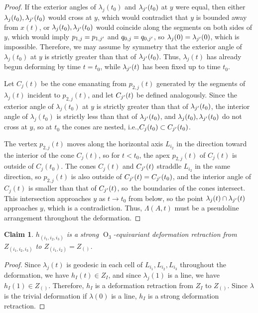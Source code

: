 \documentclass[11pt]{article}
\newcommand{\ie}{i.e.,\xspace}
\numberwithin{equation}{section}
\newtheorem{claim}[theorem]{Claim}
\theoremstyle{remark}
\DeclareMathOperator{\orth}{O}
\begin{document}
\begin{proof}
If the exterior angles of $\lambda_j(t_0)$ and $\lambda_{j'}(t_0)$ at $y$ were equal, then either $\lambda_j(t_0),\lambda_{j'}(t_0)$ would cross at $y$, which would contradict that $y$ is bounded away from $x(t)$, or $\lambda_j(t_0),\lambda_{j'}(t_0)$ would coincide along the segments on both sides of $y$, which would imply $p_{1,j} = p_{1,{j'}}$ and $q_{0,j} = q_{0,{j'}}$, so $\lambda_j(0) = \lambda_{j'}(0)$, which is impossible.
Therefore, we may assume by symmetry that the exterior angle of $\lambda_j(t_0)$ at $y$ is strictly greater than that of $\lambda_{j'}(t_0)$. Thus, $\lambda_j(t)$ has already begun deforming by time $t=t_0$, while $\lambda_{j'}(t)$ has been fixed up to time $t_0$.

Let $C_j(t)$ be the cone emanating from $p_{2,j}(t)$ generated by the segments of $\lambda_j(t)$ incident to $p_{2,j}(t)$, and let $C_{j'}(t)$ be defined analogously.
Since the exterior angle of $\lambda_j(t_0)$ at $y$ is strictly greater than that of $\lambda_{j'}(t_0)$, the interior angle of $\lambda_j(t_0)$ is strictly less than that of $\lambda_{j'}(t_0)$, and $\lambda_j(t_0),\lambda_{j'}(t_0)$ do not cross at $y$, so at $t_0$ the cones are nested, \ie $C_j(t_0) \subset C_{j'}(t_0)$.

The vertex $p_{2,j}(t)$ moves along the horizontal axis $L_{i_2}$ in the direction toward the interior of the cone $C_j(t)$, so for $t < t_0$, the apex $p_{2,j}(t)$ of $C_j(t)$ is outside of $C_j(t_0)$. The cones $C_j(t)$ and $C_{j'}(t)$ straddle $L_{i_2}$ in the same direction, so $p_{2,j}(t)$ is also outside of $C_{j'}(t)= C_{j'}(t_0)$, and the interior angle of $C_j(t)$ is smaller than that of $C_{j'}(t)$, so~the boundaries of the cones intersect.
This intersection approaches $y$ as $t\to t_0$ from below, so the point $\lambda_j(t)\cap \lambda_{j'}(t)$ approaches $y$, which is a contradiction.
Thus, $\Lambda(A,t)$ must be a pseudoline arrangement throughout the deformation.
\end{proof}

\begin{claim}\label{claim-deform-h3}
$h_{(i_1,i_2,i_3)}$ is a strong $\orth_3$-equivariant deformation retraction from $Z_{(i_1,i_2,i_3)}$ to $Z_{(i_1,i_2)} = Z_{()}$.
\end{claim}

\begin{proof}
Since $\lambda_j(t)$ is geodesic in each cell of $L_{i_1},L_{i_2},L_{i_3}$ throughout the deformation, we have $h_I(t) \in Z_I$, and since $\lambda_j(1)$ is a line, we have $h_I(1) \in Z_{()}$.
Therefore, $h_I$ is a deformation retraction from $Z_I$ to $Z_{()}$.
Since $\lambda$ is the trivial deformation if $\lambda(0)$ is a line, $h_I$ is a strong deformation retraction.
\end{proof}
\end{document}

